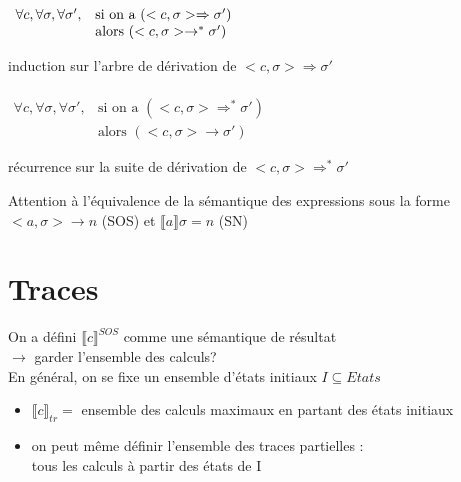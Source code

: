 \documentclass[10pt,a4paper]{article}
\newcommand{\semm}[1]{\llbracket #1 \rrbracket }
\begin{document}
\begin{lem}[1] 
$ \begin{array}{l l}
\\
\forall c, \forall \sigma, \forall \sigma', & \text{si on a }(<c, \sigma> \Rightarrow \sigma')\\
											& \text{alors } (<c, \sigma> \rightarrow^* \sigma')
\end{array}$
\end{lem}

\begin{dem}
 induction sur l'arbre de dérivation de $<c, \sigma> \Rightarrow \sigma'$
\end{dem}


\begin{lem}
$ \begin{array}{ll}
\\
\forall c, \forall \sigma, \forall \sigma', &\text{si on a }(<c, \sigma> \Rightarrow^* \sigma')\\
											& \text{alors } (<c, \sigma> \rightarrow \sigma')
\end{array}$
\end{lem}

\begin{dem}
 récurrence sur la suite de dérivation de $<c, \sigma> \Rightarrow^* \sigma'$
\end{dem}


\begin{rem}Attention à l'équivalence de la sémantique des expressions sous la forme \\$<a, \sigma> \rightarrow n$ (SOS) et $\semm{a} \sigma = n$ (SN)
\end{rem}

\section{Traces}
On a défini $\semm{c}^{SOS}$ comme une sémantique de résultat\\
$\longrightarrow$ garder l'ensemble des calculs?\\
En général, on se fixe un ensemble d'états initiaux $I \subseteq Etats$
\begin{itemize}
\item $\semm{c}_{tr} = $ ensemble des calculs maximaux en partant des états initiaux
\item on peut même définir l'ensemble des traces partielles : \\
tous les calculs à partir des états de I
\end{itemize}
\end{document}
